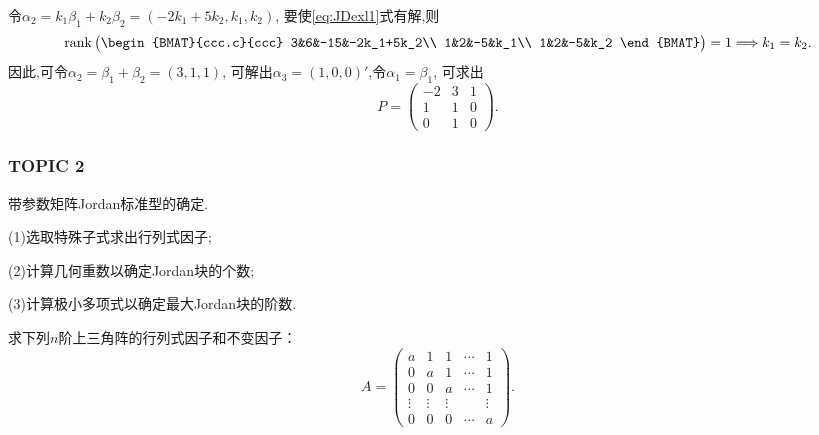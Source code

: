 \begin{solution}
  令$\alpha_2=k_1\beta_1+k_2\beta_2=(-2k_1+5k_2,k_1,k_2)$,
  要使\eqref{eq:JDexl1}式有解,则
  \[ \rank
    \begin{pmatrix}
      \begin{BMAT}{ccc.c}{ccc}
        3&6&-15&-2k_1+5k_2\\
        1&2&-5&k_1\\
        1&2&-5&k_2
      \end{BMAT}
    \end{pmatrix}=1 \Longrightarrow k_1=k_2.  \]
  因此,可令$\alpha_2=\beta_1+\beta_2=(3,1,1)$,
  可解出$\alpha_3=(1,0,0)'$,令$\alpha_1=\beta_1$,
  可求出
  \[P=
    \begin{pmatrix}
      -2&3&1\\
      1&1&0\\
      0&1&0
    \end{pmatrix}.\]
\end{solution}

\subsubsection{TOPIC 2}
带参数矩阵Jordan标准型的确定.

(1)选取特殊子式求出行列式因子;

(2)计算几何重数以确定Jordan块的个数;

(3)计算极小多项式以确定最大Jordan块的阶数.

\begin{example}[教材P303第3题]\label{exl:JDexl2}
  求下列$n$阶上三角阵的行列式因子和不变因子：
  \[ A=\begin{pmatrix}
    a&1&1&\cdots&1\\
    0&a&1&\cdots&1\\
    0&0&a&\cdots&1\\
    \vdots&\vdots&\vdots&&\vdots\\
    0&0&0&\cdots&a
  \end{pmatrix}. \]
\end{example}

